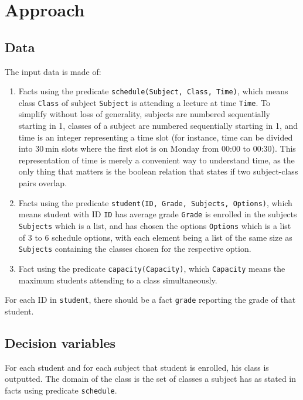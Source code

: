 \documentclass[runningheads]{llncs}
\begin{document}
\section{Approach}

\subsection{Data}

The input data is made of:
\begin{enumerate}
    \item Facts using the predicate \texttt{schedule(Subject, Class, Time)}, which means class \texttt{Class} of subject \texttt{Subject} is attending a lecture at time \texttt{Time}. To simplify without loss of generality, subjects are numbered sequentially starting in 1, classes of a subject are numbered sequentially starting in 1, and time is an integer representing a time slot (for instance, time can be divided into $\SI{30}{\minute}$ slots where the first slot is on Monday from 00:00 to 00:30). This representation of time is merely a convenient way to understand time, as the only thing that matters is the boolean relation that states if two subject-class pairs overlap.
    \item Facts using the predicate \texttt{student(ID, Grade, Subjects, Options)}, which means student with ID \texttt{ID} has average grade \texttt{Grade} is enrolled in the subjects \texttt{Subjects} which is a list, and has chosen the options  \texttt{Options} which is a list of 3 to 6 schedule options, with each element being a list of the same size as \texttt{Subjects} containing the classes chosen for the respective option.
    \item Fact using the predicate \texttt{capacity(Capacity)}, which \texttt{Capacity} means the maximum students attending to a class simultaneously.
\end{enumerate}

For each ID in \texttt{student}, there should be a fact \texttt{grade} reporting the grade of that student.

\subsection{Decision variables}

For each student and for each subject that student is enrolled, his class is outputted. The domain of the class is the set of classes a subject has as stated in facts using predicate \texttt{schedule}.
\end{document}
